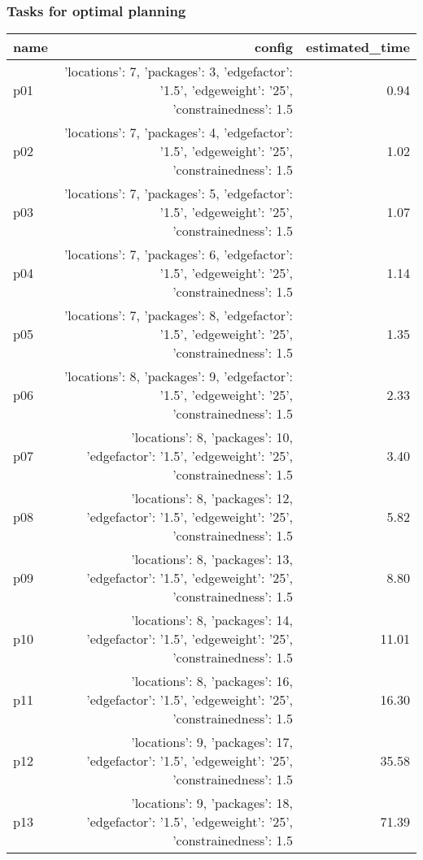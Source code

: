\documentclass{article}
\begin{document}
                                \subsubsection*{Tasks for optimal planning}
                                
                            \begin{center}
                            \scriptsize
                            \begin{tabular}{@{}l|r|r@{}}
                            name & config & estimated\_time\\\midrule
                              p01&{'locations': 7, 'packages': 3, 'edgefactor': '1.5', 'edgeweight': '25', 'constrainedness': 1.5}&0.94\\
  p02&{'locations': 7, 'packages': 4, 'edgefactor': '1.5', 'edgeweight': '25', 'constrainedness': 1.5}&1.02\\
  p03&{'locations': 7, 'packages': 5, 'edgefactor': '1.5', 'edgeweight': '25', 'constrainedness': 1.5}&1.07\\
  p04&{'locations': 7, 'packages': 6, 'edgefactor': '1.5', 'edgeweight': '25', 'constrainedness': 1.5}&1.14\\
  p05&{'locations': 7, 'packages': 8, 'edgefactor': '1.5', 'edgeweight': '25', 'constrainedness': 1.5}&1.35\\
  p06&{'locations': 8, 'packages': 9, 'edgefactor': '1.5', 'edgeweight': '25', 'constrainedness': 1.5}&2.33\\
  p07&{'locations': 8, 'packages': 10, 'edgefactor': '1.5', 'edgeweight': '25', 'constrainedness': 1.5}&3.40\\
  p08&{'locations': 8, 'packages': 12, 'edgefactor': '1.5', 'edgeweight': '25', 'constrainedness': 1.5}&5.82\\
  p09&{'locations': 8, 'packages': 13, 'edgefactor': '1.5', 'edgeweight': '25', 'constrainedness': 1.5}&8.80\\
  p10&{'locations': 8, 'packages': 14, 'edgefactor': '1.5', 'edgeweight': '25', 'constrainedness': 1.5}&11.01\\
  p11&{'locations': 8, 'packages': 16, 'edgefactor': '1.5', 'edgeweight': '25', 'constrainedness': 1.5}&16.30\\
  p12&{'locations': 9, 'packages': 17, 'edgefactor': '1.5', 'edgeweight': '25', 'constrainedness': 1.5}&35.58\\
  p13&{'locations': 9, 'packages': 18, 'edgefactor': '1.5', 'edgeweight': '25', 'constrainedness': 1.5}&71.39\\

\end{tabular}
\end{center}
\end{document}
